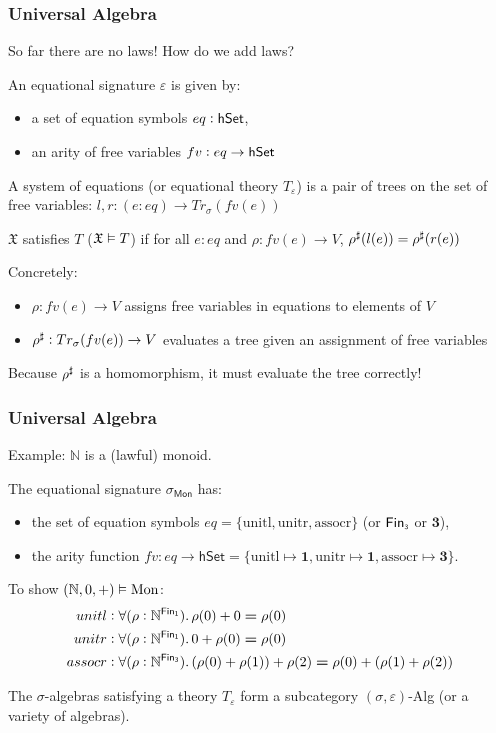 \documentclass[9pt]{beamer}
\begin{document}
\begin{frame}
\frametitle{Universal Algebra}
So far there are no \alert{laws}! How do we add \alert{laws}?

An \alert{equational signature} $\varepsilon$ is given by:
\begin{itemize}
    \item a set of \alert{equation symbols} $eq : \mathsf{hSet}$,
    \item an \alert{arity of free variables} $fv : eq \to \mathsf{hSet}$
\end{itemize}

A system of equations (or \alert{equational theory} $T_{\varepsilon}$) is a pair of trees on the set of free variables:
$l, r : (e : eq) \to Tr_\sigma(fv(e))$

$\mathfrak{X}$ satisfies $T$ ($\mathfrak{X} \vDash T$) if for all $e : eq$ and $\rho : fv(e) \to V$,
${\rho}^{\sharp}(l(e)) = {\rho}^{\sharp}(r(e))$

Concretely:
\begin{itemize}
    \item $\rho : fv(e) \to V$ assigns free variables in equations to elements of $V$
    \item ${\rho}^{\sharp} : Tr_\sigma(fv(e)) \to V$ evaluates a tree given an assignment of free variables
\end{itemize}

Because ${\rho}^{\sharp}$ is a \alert{homomorphism}, it must evaluate the tree correctly!

\end{frame}

\begin{frame}
\frametitle{Universal Algebra}
Example: $\mathbb{N}$ is a (lawful) \alert{monoid}.

The equational signature $\sigma_{\mathsf{Mon}}$ has:
\begin{itemize}
    \item the set of \alert{equation symbols} $eq = \{\text{unitl}, \text{unitr}, \text{assocr}\}$
    (or $\Fin[3]$ or $\mathbf{3}$),
    \item the \alert{arity function}
    $fv : eq \rightarrow \mathsf{hSet} = \{\text{unitl} \mapsto \mathbf{1}, \text{unitr} \mapsto \mathbf{1}, \text{assocr} \mapsto \mathbf{3}\}$.
\end{itemize}

To show $(\mathbb{N},0,+) \vDash \text{Mon}$:
\begin{align*}
unitl  & : \forall (\rho : \Nat^{\Fin[1]}). \, \rho(0) + 0 \id \rho(0) \\
unitr  & : \forall (\rho : \Nat^{\Fin[1]}). \, 0 + \rho(0) \id \rho(0) \\
assocr & : \forall (\rho : \Nat^{\Fin[3]}). \, (\rho(0) + \rho(1)) + \rho(2) \id \rho(0) + (\rho(1) + \rho(2))
\end{align*} 

The $\sigma$-algebras satisfying a theory $T_{\varepsilon}$ form a subcategory $(\sigma,\varepsilon)$-Alg (or a variety of algebras).
\end{frame}
\end{document}
